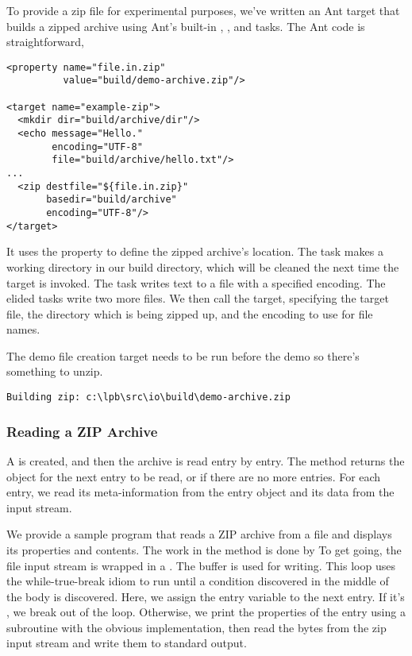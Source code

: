 To provide a zip file for experimental purposes, we've written
an Ant target  that builds a zipped archive
using Ant's built-in , , and 
tasks.  The Ant code is straightforward,
%
\begin{verbatim}
<property name="file.in.zip" 
          value="build/demo-archive.zip"/>

<target name="example-zip">
  <mkdir dir="build/archive/dir"/>    
  <echo message="Hello."  
        encoding="UTF-8" 
        file="build/archive/hello.txt"/>
...
  <zip destfile="${file.in.zip}"
       basedir="build/archive" 
       encoding="UTF-8"/>
</target>
\end{verbatim}
%
It uses the property  to define the zipped archive's
location.  The  task makes a working directory in our
build directory, which will be cleaned the next time the 
target is invoked.  The  task writes text to a file with a
specified encoding.  The elided tasks write two more files.  We then
call the  target, specifying the target file, the directory
which is being zipped up, and the encoding to use for file names.

The demo file creation target needs to be run before the demo so
there's something to unzip.
%
\begin{verbatim}
Building zip: c:\lpb\src\io\build\demo-archive.zip
\end{verbatim}
%

\subsubsection{Reading a ZIP Archive}

A  is created, and then the archive is read entry
by entry.  The method  returns the
 object for the next entry to be read, or 
if there are no more entries.  For each entry, we read its
meta-information from the entry object and its data from the
input stream.

We provide a sample program  that reads a ZIP
archive from a file and displays its properties and contents.  The
work in the  method is done by
%
%
To get going, the file input stream is wrapped in a
.  The buffer  is used for
writing.  This loop uses the while-true-break idiom to
run until a condition discovered in the middle of the body
is discovered.  Here, we assign the entry variable to
the next entry.  If it's , we break out of the
loop.  Otherwise, we print the properties of the entry
using a subroutine with the obvious implementation, then
read the bytes from the zip input stream and write
them to standard output.
  
